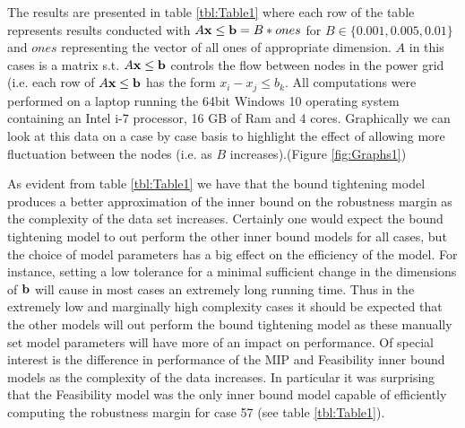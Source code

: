 The results are presented in table \ref{tbl:Table1} where each row of the table represents results conducted with $A\bold x\leq \bold b = B*ones$ for $B\in\{0.001, 0.005,0.01\}$ and $ones$ representing the vector of all ones of appropriate dimension. 
$A$ in this cases is a matrix s.t. $A\bold x\leq \bold b$ controls the flow between nodes in the power grid (i.e. each row of $A\bold x\leq \bold b$ has the form $x_i-x_j\leq b_k$. 
All computations were performed on a laptop running the 64bit Windows 10 operating system containing an Intel i-7 processor, 16 GB of Ram and 4 cores. 
Graphically we can look at this data on a case by case basis to highlight the effect of allowing more fluctuation between the nodes (i.e. as $B$ increases).(Figure \ref{fig:Graphs1}) 




As evident from table \ref{tbl:Table1} we have that the bound tightening model produces a better approximation of the inner bound on the robustness margin as the complexity of the data set increases. 
Certainly one would expect the bound tightening model to out perform the other inner bound models for all cases, but the choice of model parameters has a big effect on the efficiency of the model. 
For instance, setting a low tolerance for a minimal sufficient change in the dimensions of $\bold b$ will cause in most cases an extremely long running time. 
Thus in the extremely low and marginally high complexity cases it should be expected that the other models will out perform the bound tightening model as these manually set model parameters will have more of an impact on performance. 
Of special interest is the difference in performance of the MIP and Feasibility inner bound models as the complexity of the data increases. 
In particular it was surprising that the Feasibility model was the only inner bound model capable of efficiently computing the robustness margin for case 57 (see table \ref{tbl:Table1}). 
